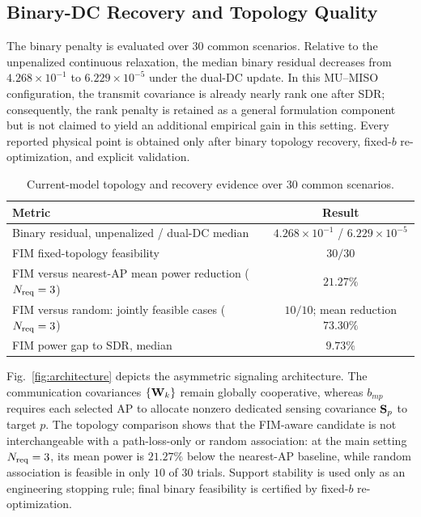 \subsection{Binary-DC Recovery and Topology Quality}
The binary penalty is evaluated over $30$ common scenarios. Relative to the
unpenalized continuous relaxation, the median binary residual decreases from
$4.268\times10^{-1}$ to $6.229\times10^{-5}$ under the dual-DC update.
In this MU--MISO configuration, the transmit covariance is already nearly
rank one after SDR; consequently, the rank penalty is retained as a general
formulation component but is not claimed to yield an additional empirical
gain in this setting. Every reported physical point is obtained only after
binary topology recovery, fixed-$b$ re-optimization, and explicit validation.

\begin{table}[htbp]
\centering
\caption{Current-model topology and recovery evidence over $30$ common scenarios.}
\label{tab:main-mc}
\begin{tabular}{lc}
\toprule
Metric & Result\\
\midrule
Binary residual, unpenalized / dual-DC median & $4.268\times10^{-1}$ / $6.229\times10^{-5}$\\
FIM fixed-topology feasibility & $30/30$\\
FIM versus nearest-AP mean power reduction ($N_{\rm req}=3$) & $21.27\%$\\
FIM versus random: jointly feasible cases ($N_{\rm req}=3$) & $10/10$; mean reduction $73.30\%$\\
FIM power gap to SDR, median & $9.73\%$\\
\bottomrule
\end{tabular}
\end{table}

Fig.~\ref{fig:architecture} depicts the asymmetric signaling architecture.
The communication covariances $\{\mathbf{W}_k\}$ remain globally cooperative,
whereas $b_{mp}$ requires each selected AP to allocate nonzero dedicated
sensing covariance $\mathbf{S}_p$ to target $p$. The topology comparison shows
that the FIM-aware candidate is not interchangeable with a path-loss-only or
random association: at the main setting $N_{\rm req}=3$, its mean power is
$21.27\%$ below the nearest-AP baseline, while random association is feasible
in only $10$ of $30$ trials. Support
stability is used only as an engineering stopping rule; final binary
feasibility is certified by fixed-$b$ re-optimization.

